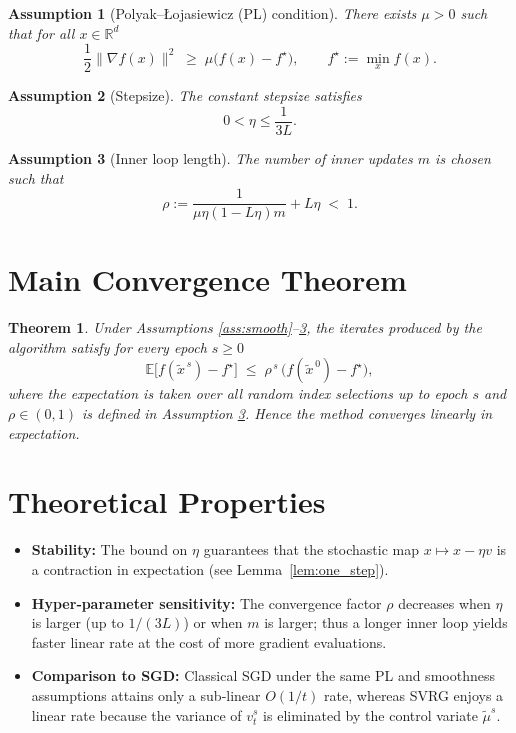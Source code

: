 \documentclass[11pt]{article}
\newtheorem{theorem}{Theorem}
\newtheorem{assumption}{Assumption}
\newcommand{\EE}{\mathbb{E}}
\newcommand{\RR}{\mathbb{R}}
\begin{document}
\begin{assumption}[Polyak–Łojasiewicz (PL) condition]\label{ass:pl}
There exists $\mu>0$ such that for all $x\in\RR^{d}$
\[
\frac{1}{2}\|\nabla f(x)\|^{2}\;\ge\;\mu\bigl(f(x)-f^{\star}\bigr),
\qquad f^{\star}:=\min_{x}f(x).
\]
\end{assumption}

\begin{assumption}[Stepsize]\label{ass:stepsize}
The constant stepsize satisfies
\[
0<\eta\le \frac{1}{3L}.
\]
\end{assumption}

\begin{assumption}[Inner loop length]\label{ass:m}
The number of inner updates $m$ is chosen such that
\[
\rho:=\frac{1}{\mu\eta(1-L\eta)m}+L\eta\;<\;1.
\]
\end{assumption}

\section*{Main Convergence Theorem}
\begin{theorem}\label{thm:linear}
Under Assumptions \ref{ass:smooth}–\ref{ass:m}, the iterates produced by the algorithm satisfy for every epoch $s\ge0$
\[
\EE\!\bigl[f(\tilde{x}^{\,s})-f^{\star}\bigr]\;\le\;\rho^{\,s}\,\bigl(f(\tilde{x}^{\,0})-f^{\star}\bigr),
\tag{4}
\]
where the expectation is taken over all random index selections up to epoch $s$ and $\rho\in(0,1)$ is defined in Assumption \ref{ass:m}. Hence the method converges \emph{linearly} in expectation.
\end{theorem}

\section*{Theoretical Properties}
\begin{itemize}[leftmargin=*]
    \item \textbf{Stability:} The bound on $\eta$ guarantees that the stochastic map $x\mapsto x-\eta v$ is a contraction in expectation (see Lemma~\ref{lem:one_step}).
    \item \textbf{Hyper‑parameter sensitivity:} The convergence factor $\rho$ decreases when $\eta$ is larger (up to $1/(3L)$) or when $m$ is larger; thus a longer inner loop yields faster linear rate at the cost of more gradient evaluations.
    \item \textbf{Comparison to SGD:} Classical SGD under the same PL and smoothness assumptions attains only a sub‑linear $O(1/t)$ rate, whereas SVRG enjoys a linear rate because the variance of $v_{t}^{s}$ is eliminated by the control variate $\tilde{\mu}^{s}$.
\end{itemize}
\end{document}
